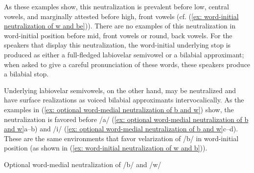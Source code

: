As these examples show, this neutralization is prevalent before low, central vowels, and marginally attested before high, front vowels (cf. (\ref{ex: word-initial neutralization of w and be})). There are no examples of this neutralization in word-initial position before mid, front vowels or round, back vowels. For the speakers that display this neutralization, the word-initial underlying stop is produced as either a full-fledged labiovelar semivowel or a bilabial approximant; when asked to give a careful pronunciation of these words, these speakers produce a bilabial stop.

Underlying labiovelar semivowels, on the other hand, may be neutralized and have surface realizations as voiced bilabial approximants intervocalically. As the examples in (\ref{ex: optional word-medial neutralization of b and w}) show, the neutralization is favored before /a/ (\ref{ex: optional word-medial neutralization of b and w}a--b) and /i/ (\ref{ex: optional word-medial neutralization of b and w}c--d). These are the same environments that favor velarization of /b/ in word-initial position (as shown in (\ref{ex: word-initial neutralization of w and b})).

\ea\label{ex: optional word-medial neutralization of b and w}
{Optional word-medial neutralization of /b/ and /w/}

    \z
\z

